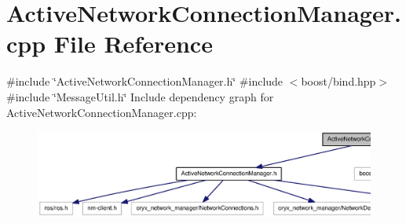 \section{\-Active\-Network\-Connection\-Manager.\-cpp \-File \-Reference}
\label{ActiveNetworkConnectionManager_8cpp}
{\ttfamily \#include \char`\"{}\-Active\-Network\-Connection\-Manager.\-h\char`\"{}}\*
{\ttfamily \#include $<$boost/bind.\-hpp$>$}\*
{\ttfamily \#include \char`\"{}\-Message\-Util.\-h\char`\"{}}\*
\-Include dependency graph for \-Active\-Network\-Connection\-Manager.\-cpp\-:
\nopagebreak
\begin{figure}[H]
\begin{center}
\leavevmode
\includegraphics[width=350pt]{ActiveNetworkConnectionManager_8cpp__incl}
\end{center}
\end{figure}
